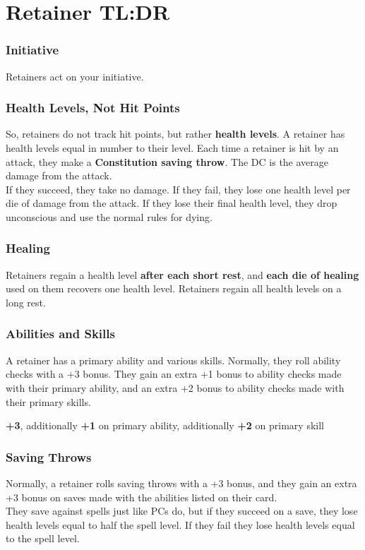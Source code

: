 \documentclass[letterpaper,10pt,twoside,twocolumn,openany]{book}
\begin{document}
\footnotesize

\begingroup
\DndSetThemeColor[PhbMauve]

\chapter{Retainer TL:DR}
\label{ch:retainers_short}

\subsection{Initiative}
Retainers act on your initiative.

\subsection{Health Levels, Not Hit Points}
So, retainers do not track hit points, but rather \textbf{health levels}. A retainer has health levels equal in number to their level. Each time a retainer is hit by an attack, they make a \textbf{Constitution saving throw}. The DC is the average damage from the attack.\\
If they succeed, they take no damage. If they fail, they lose one health level per die of damage from the attack. If they lose their final health level, they drop unconscious and use the normal rules for dying.

\subsection{Healing}
Retainers regain a health level \textbf{after each short rest}, and \textbf{each die of healing} used on them recovers one health level. Retainers regain all health levels on a long rest.

\subsection{Abilities and Skills}
A retainer has a primary ability and various skills. Normally, they roll ability checks with a +3 bonus. They gain an extra +1 bonus to ability checks made with their primary ability, and an extra +2 bonus to ability checks made with their primary skills.

\begin{DndSidebar}{}
    \textbf{+3}, additionally \textbf{+1} on primary ability, additionally \textbf{+2} on primary skill
\end{DndSidebar}

\subsection{Saving Throws}
Normally, a retainer rolls saving throws with a +3 bonus, and they gain an extra +3 bonus on saves made with the abilities listed on their card.\\
They save against spells just like PCs do, but if they succeed on a save, they lose health levels equal to half the spell level. If they fail they lose health levels equal to the spell level.
\end{document}
